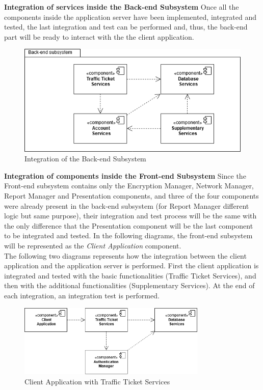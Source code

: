     \noindent\textbf{Integration of services inside the Back-end Subsystem}\newline
Once all the components inside the application server have been implemented, integrated and tested, the last integration and test can be performed and, thus, the back-end part will be ready to interact with the the client application.
    
         \begin{figure}[H]
             \centering
      \includegraphics[width=1\textwidth]{Images/back_end_definitivo.png}
        \caption{Integration of the Back-end Subsystem}
    \end{figure}
\vspace{2mm}
\noindent\textbf{Integration of components inside the Front-end Subsystem}\newline
Since the Front-end subsystem contains only the Encryption Manager, Network Manager, Report Manager and Presentation components, and three of the four components were already present in the back-end subsystem (for Report Manager different logic but same purpose), their integration and test process will be the same with the only difference that the Presentation component will be the last component to be integrated and tested. In the following diagrams, the front-end subsystem will be represented as the \noindent\textit{Client Application} component.\newline \\
The following two diagrams represents how the integration between the client application and the application server is performed. First the client application is integrated and tested with the basic functionalities (Traffic Ticket Services), and then with the additional functionalities (Supplementary Services). At the end of each integration, an integration test is performed.
\begin{figure}[H]
             \centering
          \includegraphics[width=0.8\textwidth]{Images/client_tt_services.png}
        \caption{Client Application with Traffic Ticket Services}
        
    \end{figure}
